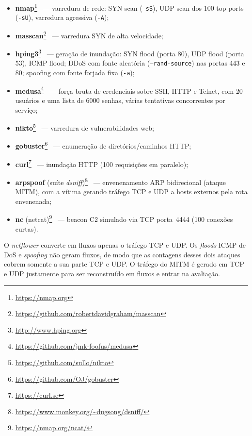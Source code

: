 \documentclass[12pt]{article}
\begin{document}
\begin{itemize}
  \item \textbf{nmap}\footnote{\url{https://nmap.org}}~\cite{nmap} — varredura de
    rede: SYN scan (\texttt{-sS}), UDP scan dos 100 top ports (\texttt{-sU}),
    varredura agressiva (\texttt{-A});
  \item \textbf{masscan}\footnote{\url{https://github.com/robertdavidgraham/masscan}}~\cite{masscan}
    — varredura SYN de alta velocidade;
  \item \textbf{hping3}\footnote{\url{http://www.hping.org}}~\cite{hping3} —
    geração de inundação: SYN flood (porta 80), UDP flood (porta 53), ICMP flood;
    DDoS com fonte aleatória (\texttt{--rand-source}) nas portas 443 e 80;
    spoofing com fonte forjada fixa (\texttt{-a});
  \item \textbf{medusa}\footnote{\url{https://github.com/jmk-foofus/medusa}}~\cite{medusa}
    — força bruta de credenciais sobre SSH, HTTP e Telnet, com 20 usuários e uma
    lista de 6000 senhas, várias tentativas concorrentes por serviço;
  \item \textbf{nikto}\footnote{\url{https://github.com/sullo/nikto}}~\cite{nikto}
    — varredura de vulnerabilidades web;
  \item \textbf{gobuster}\footnote{\url{https://github.com/OJ/gobuster}}~\cite{gobuster}
    — enumeração de diretórios/caminhos HTTP;
  \item \textbf{curl}\footnote{\url{https://curl.se}}~\cite{curl} — inundação HTTP
    (100 requisições em paralelo);
  \item \textbf{arpspoof} (suíte \textit{dsniff})\footnote{\url{https://www.monkey.org/~dugsong/dsniff/}}~\cite{dsniff}
    — envenenamento ARP bidirecional (ataque MITM), com a vítima gerando tráfego
    TCP e UDP a hosts externos pela rota envenenada;
  \item \textbf{nc} (netcat)\footnote{\url{https://nmap.org/ncat/}}~\cite{ncat} —
    beacon C2 simulado via TCP porta~4444 (100 conexões curtas).
\end{itemize}

O \textit{netflower} converte em fluxos apenas o tráfego TCP e UDP. Os
\textit{floods} ICMP de DoS e \textit{spoofing} não geram fluxos, de modo que as
contagens desses dois ataques cobrem somente a sua parte TCP e UDP. O tráfego do
MITM é gerado em TCP e UDP justamente para ser reconstruído em fluxos e entrar na
avaliação.
\end{document}

